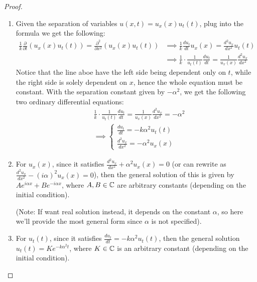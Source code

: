 \documentclass{article}
\begin{document}
\begin{proof}

    \hfil

    \begin{enumerate}
        \item Given the separation of variables $u(x,t)=u_x(x)u_t(t)$, plug into the formula we get the following:
        \begin{align}
            \frac{1}{k}\frac{\partial}{\partial t}(u_x(x)u_t(t))=\frac{\partial^2}{\partial x^2}(u_x(x)u_t(t))&\implies \frac{1}{k}\frac{d u_t}{dt}u_x(x)=\frac{d^2u_x}{dx^2}u_t(t)\\
            &\implies \frac{1}{k}\cdot \frac{1}{u_t(t)}\frac{du_t}{dt}=\frac{1}{u_x(x)}\frac{d^2u_x}{dx^2}
        \end{align}
        Notice that the line aboe have the left side being dependent only on $t$, while the right side is solely dependent on $x$, hence the whole equation must be constant. With the separation constant given by $-\alpha^2$, we get the following two ordinary differential equations:
        \begin{align}
            &\frac{1}{k}\cdot \frac{1}{u_t(t)}\frac{du_t}{dt}=\frac{1}{u_x(x)}\frac{d^2u_x}{dx^2}=-\alpha^2\\
            &\implies \begin{cases}
                \frac{du_t}{dt}=-k\alpha^2 u_t(t)\\
                \frac{d^2u_x}{dx^2}=-\alpha^2u_x(x)
            \end{cases}
        \end{align}

        \hfil

        \item For $u_x(x)$, since it satisfies $\frac{d^2u_x}{dx^2}+\alpha^2u_x(x)=0$ (or can rewrite as $\frac{d^2 u_x}{dx^2}-(i\alpha)^2 u_x(x)=0$), then the general solution of this is given by $Ae^{i\alpha x}+Be^{-i\alpha x}$, where $A,B\in\mathbb{C}$ are arbitrary constants (depending on the initial condition).
        
        (Note: If want real solution instead, it depends on the constant $\alpha$, so here we'll provide the most general form since $\alpha$ is not specified).

        \hfil
        
        \item For $u_t(t)$, since it satisfies $\frac{du_t}{dt}=-k\alpha^2 u_t(t)$, then the general solution  $u_t(t)=Ke^{-k\alpha^2 t}$, where $K\in\mathbb{C}$ is an arbitrary constant (depending on the initial condition).
        

\end{enumerate}
\end{proof}
\end{document}
